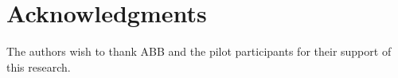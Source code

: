 \documentclass{sig-alternate}
\begin{document}
\section{Acknowledgments}
The authors wish to thank ABB and the pilot participants for their support of this research.

%

\balance
 
%
%
\end{document}
